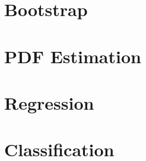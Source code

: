 \documentclass[fontsize=12pt]{scrartcl}
\begin{document}

\thispagestyle{empty}
{\hypersetup{linkcolor=black}\tableofcontents}
\newpage


\part{Bootstrap}
%
\newpage
\part{PDF Estimation}
%
\newpage
\part{Regression}

\newpage
\part{Classification}
%
\newpage
\end{document}
